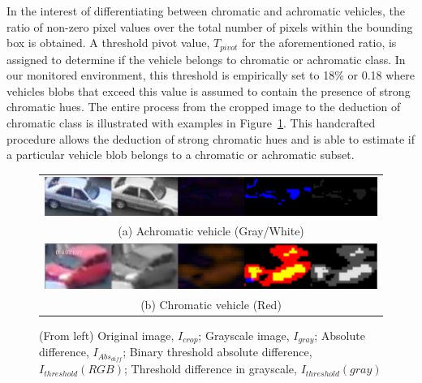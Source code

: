 In the interest of differentiating between chromatic and achromatic vehicles, the ratio of non-zero pixel values over the total number of pixels within the bounding box is obtained.
A threshold pivot value, $T_{pivot}$ for the aforementioned ratio, is assigned to determine if the vehicle belongs to chromatic or achromatic class.
In our monitored environment, this threshold is empirically set to 18\% or 0.18 where vehicles blobs that exceed this value is assumed to contain the presence of strong chromatic hues.
The entire process from the cropped image to the deduction of chromatic class is illustrated with examples in Figure~\ref{fig:achromatic_thresh}. This handcrafted procedure allows the deduction of strong chromatic hues and is able to estimate if a particular vehicle blob belongs to a chromatic or achromatic subset.
\begin{figure}[htb!]
  \centering
\begin{tabular}{c}
 \includegraphics[width=0.9\linewidth]{image/general/achromatic_threshold5.PNG} \\
 (a) Achromatic vehicle (Gray/White) \\
 \includegraphics[width=0.9\linewidth]{image/general/achromatic_threshold_color2.PNG}\\
(b) Chromatic vehicle (Red)
\end{tabular}
\caption{(From left) Original image, $I_{crop}$; Grayscale image, $I_{gray}$; Absolute difference, $I_{Abs_{diff}}$; Binary threshold absolute difference, $I_{threshold}(RGB)$; Threshold difference in grayscale, $I_{threshold}(gray)$} \label{fig:achromatic_thresh}
\end{figure}

